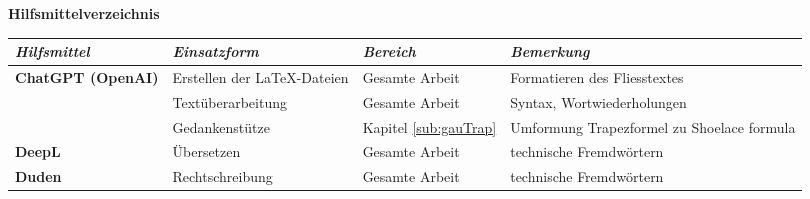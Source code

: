 
\huge\textbf{Hilfsmittelverzeichnis}

\newcommand{\tabTitle}[1]{\textbf{\textit{\large #1}}}
\renewcommand{\arraystretch}{1.5} %

\begin{table}[H]
    \centering
    \begin{tabularx}{\textwidth}{|l|X|X|X|}
        \hline
        \tabTitle{Hilfsmittel} & \tabTitle{Einsatzform} & \tabTitle{Bereich} & \tabTitle{Bemerkung} \\
        \hline

        \textbf{ChatGPT (OpenAI)} & Erstellen der LaTeX-Dateien & Gesamte Arbeit & Formatieren des Fliesstextes \\
         & Textüberarbeitung & Gesamte Arbeit & Syntax, Wortwiederholungen \\ 
         & Gedankenstütze & Kapitel \ref{sub:gauTrap} & Umformung Trapezformel zu Shoelace formula \cite{oai:chatgpt} \\
        \hline
        \textbf{DeepL} & Übersetzen & Gesamte Arbeit & technische Fremdwörtern \\
        \hline
        \textbf{Duden} & Rechtschreibung & Gesamte Arbeit & technische Fremdwörtern \\
        \hline
    \end{tabularx}
        \label{tab:tools}
\end{table}

\renewcommand{\arraystretch}{1.0}